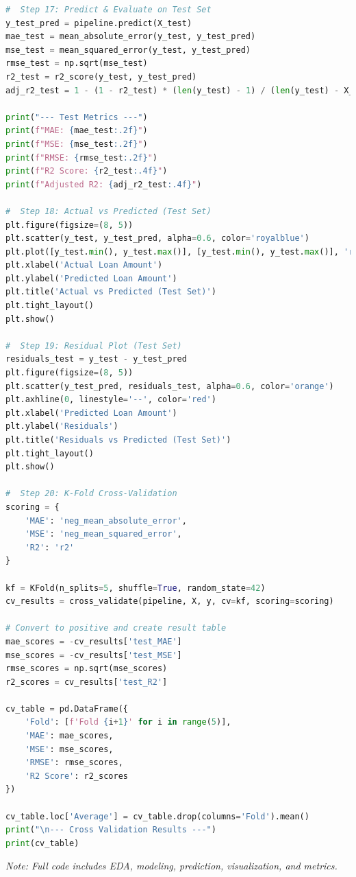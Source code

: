 \documentclass[12pt]{article}
\begin{document}
\begin{lstlisting}[language=Python]
#  Step 17: Predict & Evaluate on Test Set
y_test_pred = pipeline.predict(X_test)
mae_test = mean_absolute_error(y_test, y_test_pred)
mse_test = mean_squared_error(y_test, y_test_pred)
rmse_test = np.sqrt(mse_test)
r2_test = r2_score(y_test, y_test_pred)
adj_r2_test = 1 - (1 - r2_test) * (len(y_test) - 1) / (len(y_test) - X_test.shape[1] - 1)

print("--- Test Metrics ---")
print(f"MAE: {mae_test:.2f}")
print(f"MSE: {mse_test:.2f}")
print(f"RMSE: {rmse_test:.2f}")
print(f"R2 Score: {r2_test:.4f}")
print(f"Adjusted R2: {adj_r2_test:.4f}")

#  Step 18: Actual vs Predicted (Test Set)
plt.figure(figsize=(8, 5))
plt.scatter(y_test, y_test_pred, alpha=0.6, color='royalblue')
plt.plot([y_test.min(), y_test.max()], [y_test.min(), y_test.max()], 'r--')
plt.xlabel('Actual Loan Amount')
plt.ylabel('Predicted Loan Amount')
plt.title('Actual vs Predicted (Test Set)')
plt.tight_layout()
plt.show()

#  Step 19: Residual Plot (Test Set)
residuals_test = y_test - y_test_pred
plt.figure(figsize=(8, 5))
plt.scatter(y_test_pred, residuals_test, alpha=0.6, color='orange')
plt.axhline(0, linestyle='--', color='red')
plt.xlabel('Predicted Loan Amount')
plt.ylabel('Residuals')
plt.title('Residuals vs Predicted (Test Set)')
plt.tight_layout()
plt.show()

#  Step 20: K-Fold Cross-Validation
scoring = {
    'MAE': 'neg_mean_absolute_error',
    'MSE': 'neg_mean_squared_error',
    'R2': 'r2'
}

kf = KFold(n_splits=5, shuffle=True, random_state=42)
cv_results = cross_validate(pipeline, X, y, cv=kf, scoring=scoring)

# Convert to positive and create result table
mae_scores = -cv_results['test_MAE']
mse_scores = -cv_results['test_MSE']
rmse_scores = np.sqrt(mse_scores)
r2_scores = cv_results['test_R2']

cv_table = pd.DataFrame({
    'Fold': [f'Fold {i+1}' for i in range(5)],
    'MAE': mae_scores,
    'MSE': mse_scores,
    'RMSE': rmse_scores,
    'R2 Score': r2_scores
})

cv_table.loc['Average'] = cv_table.drop(columns='Fold').mean()
print("\n--- Cross Validation Results ---")
print(cv_table)
\end{lstlisting}

\textit{Note: Full code includes EDA, modeling, prediction, visualization, and metrics.}
\end{document}
